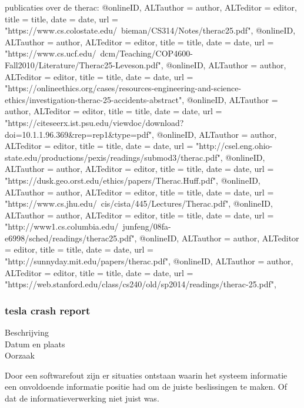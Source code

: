 {{{publicaties over de therac:
@online{ID,	ALTauthor = {author},	ALTeditor = {editor},	title = {title},	date = {date},	url = {"https://www.cs.colostate.edu/~bieman/CS314/Notes/therac25.pdf"},}
@online{ID,	ALTauthor = {author},	ALTeditor = {editor},	title = {title},	date = {date},	url = {"https://www.cs.ucf.edu/~dcm/Teaching/COP4600-Fall2010/Literature/Therac25-Leveson.pdf"},}
@online{ID,	ALTauthor = {author},	ALTeditor = {editor},	title = {title},	date = {date},	url = {"https://onlineethics.org/cases/resources-engineering-and-science-ethics/investigation-therac-25-accidents-abstract"},}
@online{ID,	ALTauthor = {author},	ALTeditor = {editor},	title = {title},	date = {date},	url = {"https://citeseerx.ist.psu.edu/viewdoc/download?doi=10.1.1.96.369&rep=rep1&type=pdf"},}
@online{ID,	ALTauthor = {author},	ALTeditor = {editor},	title = {title},	date = {date},	url = {"http://csel.eng.ohio-state.edu/productions/pexis/readings/submod3/therac.pdf"},}
@online{ID,	ALTauthor = {author},	ALTeditor = {editor},	title = {title},	date = {date},	url = {"https://dusk.geo.orst.edu/ethics/papers/Therac.Huff.pdf"},}
@online{ID,	ALTauthor = {author},	ALTeditor = {editor},	title = {title},	date = {date},	url = {"https://www.cs.jhu.edu/~cis/cista/445/Lectures/Therac.pdf"},}
@online{ID,	ALTauthor = {author},	ALTeditor = {editor},	title = {title},	date = {date},	url = {"http://www1.cs.columbia.edu/~junfeng/08fa-e6998/sched/readings/therac25.pdf"},}
@online{ID,	ALTauthor = {author},	ALTeditor = {editor},	title = {title},	date = {date},	url = {"http://sunnyday.mit.edu/papers/therac.pdf"},}
@online{ID,	ALTauthor = {author},	ALTeditor = {editor},	title = {title},	date = {date},	url = {"https://web.stanford.edu/class/cs240/old/sp2014/readings/therac-25.pdf"},}


\subsubsection{tesla crash report}

	\begin{description}
	\item[Beschrijving]
	\item[Datum en plaats] 
	\item[Oorzaak]
\end{description}
Door een softwarefout zijn er situaties ontstaan waarin het systeem informatie een onvoldoende informatie positie had om de juiste beslissingen te maken. Of dat de informatieverwerking niet juist was.


}}}
